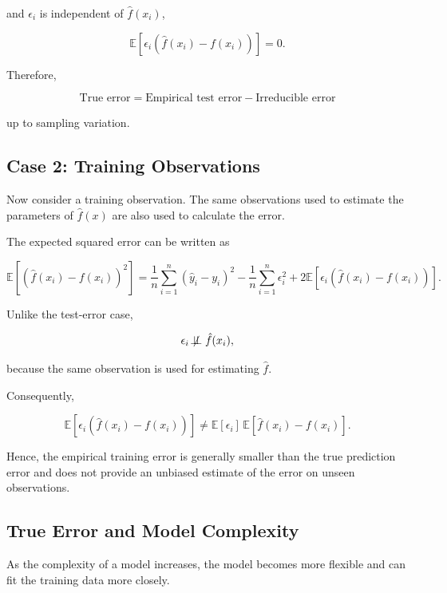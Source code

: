 \documentclass{article}
\begin{document}
and $\epsilon_i$ is independent of $\hat{f}(x_i)$,

\[
\mathbb{E}\left[
\epsilon_i
\left(\hat{f}(x_i)-f(x_i)\right)
\right]=0.
\]

Therefore,

\begin{equation}
	\boxed{
		\text{True error}
		=
		\text{Empirical test error}
		-\text{Irreducible error}
	}
\end{equation}

up to sampling variation.

\subsection{Case 2: Training Observations}

Now consider a training observation. The same observations used to estimate the parameters of $\hat{f}(x)$ are also used to calculate the error.

The expected squared error can be written as

\begin{equation}
	\mathbb{E}
	\left[
	\left(\hat{f}(x_i)-f(x_i)\right)^2
	\right]
	=
	\frac{1}{n}
	\sum_{i=1}^{n}
	(\hat{y}_i-y_i)^2
	-
	\frac{1}{n}
	\sum_{i=1}^{n}\epsilon_i^2
	+
	2\mathbb{E}
	\left[
	\epsilon_i
	\left(\hat{f}(x_i)-f(x_i)\right)
	\right].
\end{equation}

Unlike the test-error case,

\[
\epsilon_i
\not\!\perp\!\!\!\perp
\hat{f}(x_i),
\]

because the same observation is used for estimating $\hat{f}$.

Consequently,

\begin{equation}
	\mathbb{E}
	\left[
	\epsilon_i
	\left(\hat{f}(x_i)-f(x_i)\right)
	\right]
	\neq
	\mathbb{E}[\epsilon_i]\,
	\mathbb{E}
	\left[
	\hat{f}(x_i)-f(x_i)
	\right].
\end{equation}

Hence, the empirical training error is generally smaller than the true prediction error and does not provide an unbiased estimate of the error on unseen observations.

\subsection{True Error and Model Complexity}

As the complexity of a model increases, the model becomes more flexible and can fit the training data more closely.
\end{document}
